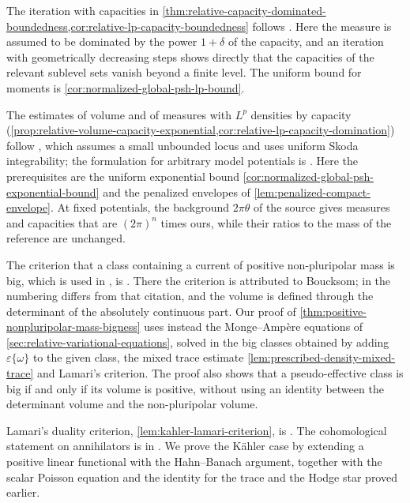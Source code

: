 The iteration with capacities in \cref{thm:relative-capacity-dominated-boundedness,cor:relative-lp-capacity-boundedness} follows \cite[Theorem 3.3 and its proof]{DDNL19log}. Here the measure is assumed to be dominated by the power $1+\delta$ of the capacity, and an iteration with geometrically decreasing steps shows directly that the capacities of the relevant sublevel sets vanish beyond a finite level. The uniform bound for moments is \cref{cor:normalized-global-psh-lp-bound}.

The estimates of volume and of measures with $L^p$ densities by capacity (\cref{prop:relative-volume-capacity-exponential,cor:relative-lp-capacity-domination}) follow \cite[Proposition 4.30]{DDNL18mono}, which assumes a small unbounded locus and uses uniform Skoda integrability; the formulation for arbitrary model potentials is \cite[Lemma 3.9 and Proposition 3.10]{DDNL19log}. Here the prerequisites are the uniform exponential bound \cref{cor:normalized-global-psh-exponential-bound} and the penalized envelopes of \cref{lem:penalized-compact-envelope}. At fixed potentials, the background $2\pi\theta$ of the source gives measures and capacities that are $(2\pi)^n$ times ours, while their ratios to the mass of the reference are unchanged.

The criterion that a class containing a current of positive non-pluripolar mass is big, which is used in \cite[Proposition~2.4.1]{XiaSampleBook}, is \cite[Proposition 1.22]{BEGZ10}. There the criterion is attributed to Boucksom; in \cite[Section 4.3, Theorem 4.7]{Bou02b} the numbering differs from that citation, and the volume is defined through the determinant of the absolutely continuous part. Our proof of \cref{thm:positive-nonpluripolar-mass-bigness} uses instead the Monge--Amp\`ere equations of \cref{sec:relative-variational-equations}, solved in the big classes obtained by adding $\varepsilon\{\omega\}$ to the given class, the mixed trace estimate \cref{lem:prescribed-density-mixed-trace} and Lamari's criterion. The proof also shows that a pseudo-effective class is big if and only if its volume is positive, without using an identity between the determinant volume and the non-pluripolar volume.

Lamari's duality criterion, \cref{lem:kahler-lamari-criterion}, is \cite[Lemma 3.3 and its proof]{Lamari1999}. The cohomological statement on annihilators is in \cite[Section~1.3, after Definition~1.2]{Lamari1999}. We prove the K\"ahler case by extending a positive linear functional with the Hahn--Banach argument, together with the scalar Poisson equation and the identity for the trace and the Hodge star proved earlier.

